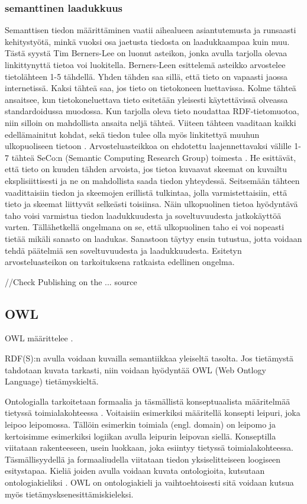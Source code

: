 \documentclass[finnish, 12pt, a4paper, elec, utf8, pdfa, online]{aaltothesis}
\begin{document}
\subsubsection{semanttinen laadukkuus}
Semanttisen tiedon määrittäminen vaatii aihealueen asiantutemusta ja runsaasti kehitystyötä, minkä vuoksi osa jaetusta tiedosta on laadukkaampaa kuin muu. Tästä syystä Tim Berners-Lee on luonut asteikon, jonka avulla tarjolla olevaa linkittynyttä tietoa voi luokitella. Berners-Leen esittelemä asteikko arvostelee tietolähteen 1-5 tähdellä. Yhden tähden saa sillä, että tieto on vapaasti jaossa internetissä. Kaksi tähteä saa, jos tieto on tietokoneen luettavissa. Kolme tähteä ansaitsee, kun tietokoneluettava tieto esitetään yleisesti käytettävissä olveassa standardoidussa muodossa. Kun tarjolla oleva tieto noudattaa RDF-tietomuotoa, niin silloin on mahdollista ansaita neljä tähteä. Viiteen tähteen vaaditaan kaikki edellämainitut kohdat, sekä tiedon tulee olla myös linkitettyä muuhun ulkopuoliseen tietoon \cite{Tim-BL}. Arvosteluasteikkoa on ehdotettu laajennettavaksi välille 1-7 tähteä SeCo:n (Semantic Computing Research Group) toimesta \cite{SeCo_stars}. He esittävät, että tieto on kuuden tähden arvoista, jos tietoa kuvaavat skeemat on kuvailtu eksplisiittisesti ja ne on mahdollista saada tiedon yhteydessä. Seitsemään tähteen vaadittaisiin tiedon ja skeemojen erillistä tulkintaa, jolla varmistettaisiin, että tieto ja skeemat liittyvät selkeästi toisiinsa. Näin ulkopuolinen tietoa hyödyntävä taho voisi varmistua tiedon laadukkuudesta ja soveltuvuudesta jatkokäyttöä varten. Tällähetkellä ongelmana on se, että ulkopuolinen taho ei voi nopeasti tietää mikäli sanasto on laadukas. Sanastoon täytyy ensin tutustua, jotta voidaan tehdä päätelmiä sen soveltuvuudesta ja laadukkuudesta. Esitetyn arvosteluasteikon on tarkoituksena ratkaista edellinen ongelma.

//Check Publishing on the ... source


\subsection{OWL}

OWL määrittelee \cite{OWL_specification}.

RDF(S):n avulla voidaan kuvailla semantiikkaa yleiseltä tasolta. Jos tietämystä tahdotaan kuvata tarkasti, niin voidaan hyödyntää OWL (Web Ontlogy Language) tietämyskieltä.

Ontologialla tarkoitetaan formaalia ja täsmällistä konseptuaalista määritelmää tietyssä toimialakohteessa \cite{Antoniou}. Voitaisiin esimerkiksi määritellä konsepti leipuri, joka leipoo leipomossa. Tällöin esimerkin toimiala (engl. domain) on leipomo ja kertoisimme esimerkiksi logiikan avulla leipurin leipovan siellä. Konseptilla viitataan rakenteeseen, usein luokkaan, joka esiintyy tietyssä toimialakohteessa. Täsmällisyydellä ja formaaliudella viitataan tiedon yksiselitteiseen loogiseen esitystapaa. Kieliä joiden avulla voidaan kuvata ontologioita, kutsutaan ontologiakieliksi \cite{Antoniou}. OWL on ontologiakieli ja vaihtoehtoisesti sitä voidaan kutsua myös tietämysksenesittämiskieleksi.
\end{document}

